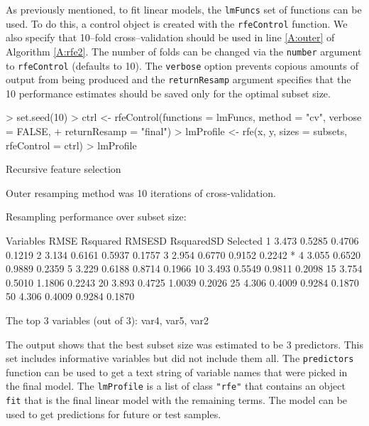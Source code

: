\documentclass[12pt]{article}
\begin{document}
As previously mentioned, to fit linear models, the \texttt{lmFuncs} set of functions can be used. To do this, a control object is created with the \texttt{rfeControl} function. We also specify that 10--fold cross--validation should be used in line \ref{A:outer} of Algorithm  \ref{A:rfe2}. The number of folds can be changed via the \texttt{number} argument to \texttt{rfeControl} (defaults to 10). The \texttt{verbose} option prevents copious amounts of output from being produced and the \texttt{returnResamp} argument specifies that the 10 performance estimates should be saved only for the optimal subset size.

\begin{Schunk}
\begin{Sinput}
> set.seed(10)
> ctrl <- rfeControl(functions = lmFuncs, method = "cv", verbose = FALSE, 
+     returnResamp = "final")
> lmProfile <- rfe(x, y, sizes = subsets, rfeControl = ctrl)
> lmProfile
\end{Sinput}
\begin{Soutput}
Recursive feature selection

Outer resamping method was 10 iterations of cross-validation. 

Resampling performance over subset size:

 Variables  RMSE Rsquared RMSESD RsquaredSD Selected
         1 3.473   0.5285 0.4706     0.1219         
         2 3.134   0.6161 0.5937     0.1757         
         3 2.954   0.6770 0.9152     0.2242        *
         4 3.055   0.6520 0.9889     0.2359         
         5 3.229   0.6188 0.8714     0.1966         
        10 3.493   0.5549 0.9811     0.2098         
        15 3.754   0.5010 1.1806     0.2243         
        20 3.893   0.4725 1.0039     0.2026         
        25 4.306   0.4009 0.9284     0.1870         
        50 4.306   0.4009 0.9284     0.1870         

The top 3 variables (out of 3):
   var4, var5, var2
\end{Soutput}
\end{Schunk}
The output shows that the  best subset size was estimated to be 3 predictors. This set includes informative variables but did not include them all. The \texttt{predictors} function can be used to get a text string of variable names that were picked in the final model. The \texttt{lmProfile} is a list of class \texttt{"rfe"} that contains an object \texttt{fit} that is the final linear model with the remaining terms. The model can be used to get predictions for future or test samples. 
\end{document}
